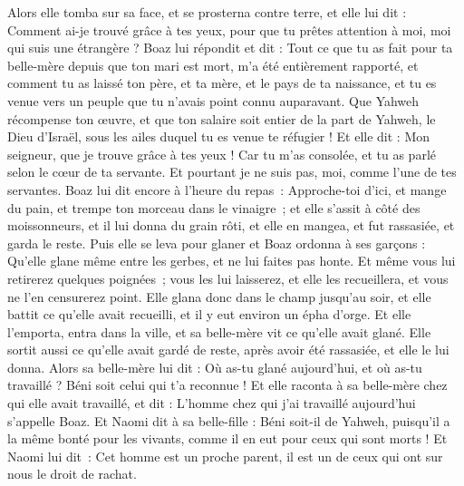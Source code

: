\begin{multicols}{2}
Alors elle tomba sur sa face, et se prosterna contre terre, et elle lui dit : Comment ai-je trouvé grâce à tes yeux, pour que tu prêtes attention à moi, moi qui suis une étrangère ?
Boaz lui répondit et dit : Tout ce que tu as fait pour ta belle-mère depuis que ton mari est mort, m'a été entièrement rapporté, et comment tu as laissé ton père, et ta mère, et le pays de ta naissance, et tu es venue vers un peuple que tu n’avais point connu auparavant.
Que Yahweh récompense ton œuvre, et que ton salaire soit entier de la part de Yahweh, le Dieu d'Israël, sous les ailes duquel tu es venue te réfugier !
Et elle dit : Mon seigneur, que je trouve grâce à tes yeux ! Car tu m'as consolée, et tu as parlé selon le cœur de ta servante. Et pourtant je ne suis pas, moi, comme l'une de tes servantes.
Boaz lui dit encore à l’heure du repas : Approche-toi d’ici, et mange du pain, et trempe ton morceau dans le vinaigre ; et elle s’assit à côté des moissonneurs, et il lui donna du grain rôti, et elle en mangea, et fut rassasiée, et garda le reste.
Puis elle se leva pour glaner et Boaz ordonna à ses garçons : Qu'elle glane même entre les gerbes, et ne lui faites pas honte.
Et même vous lui retirerez quelques poignées ; vous les lui laisserez, et elle les recueillera, et vous ne l’en censurerez point.
Elle glana donc dans le champ jusqu'au soir, et elle battit ce qu'elle avait recueilli, et il y eut environ un épha d'orge.
Et elle l'emporta, entra dans la ville, et sa belle-mère vit ce qu'elle avait glané. Elle sortit aussi ce qu’elle avait gardé de reste, après avoir été rassasiée, et elle le lui donna.
Alors sa belle-mère lui dit : Où as-tu glané aujourd'hui, et où as-tu travaillé ? Béni soit celui qui t'a reconnue ! Et elle raconta à sa belle-mère chez qui elle avait travaillé, et dit : L'homme chez qui j'ai travaillé aujourd'hui s'appelle Boaz.
Et Naomi dit à sa belle-fille : Béni soit-il de Yahweh, puisqu'il a la même bonté pour les vivants, comme il en eut pour ceux qui sont morts ! Et Naomi lui dit : Cet homme est un proche parent, il est un de ceux qui ont sur nous le droit de rachat.

\end{multicols}
